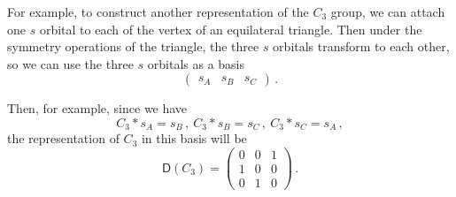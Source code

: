 \documentclass{article}
\theoremstyle{plain}\theoremheaderfont{\normalfont\itshape}\theorembodyfont{\rmfamily}\theoremseparator{.}\newtheorem*{rem}{Remark}\newtheorem*{ex}{Example}\newtheorem*{proof}{Proof}\newtheorem*{altp}{Alternative proof}
\theoremstyle{plain}\theoremheaderfont{\normalfont\bfseries}\theorembodyfont{\rmfamily}\theoremseparator{.}\newtheorem{thm}{Theorem}[section]\newtheorem{lem}[thm]{Lemma}\newtheorem{prop}[thm]{Proposition}\newtheorem*{cor}{Corollary}\newtheorem{defn}[thm]{Definition}\newtheorem{clm}[thm]{Claim}\newtheorem{clminproof}{Claim}\newtheorem*{law}{Law}\newtheorem{pos}[thm]{Postulate}
\theoremstyle{break}\theoremheaderfont{\normalfont\itshape}\theorembodyfont{\rmfamily}\theoremseparator{.\medskip}\newtheorem*{proofskip}{Proof}\newtheorem*{exs}{Examples}\newtheorem*{rems}{Remarks}
\theoremstyle{break}\theoremheaderfont{\normalfont\bfseries}\theorembodyfont{\rmfamily}\theoremseparator{.\medskip}\newtheorem{lemskip}[thm]{Lemma}\newtheorem{defnskip}[thm]{Definition}\newtheorem{propskip}[thm]{Proposition}\newtheorem{thmskip}[thm]{Theorem}
\numberwithin{equation}{section}
\newcommand{\DD}{\mathsf{D}}
\begin{document}
    For example, to construct another representation of the \(C_3\) group, we can attach one \(s\) orbital to each of the vertex of an equilateral triangle. Then under the symmetry operations of the triangle, the three \(s\) orbitals transform to each other, so we can use the three \(s\) orbitals as a basis
    \begin{equation}
        \begin{pmatrix}
            s_A & s_B & s_C
        \end{pmatrix}\,.
    \end{equation}
    \begin{figure}[ht!]
        \centering
    \end{figure}

    Then, for example, since we have
    \begin{equation}
        C_3*s_A=s_B\,,\ C_3*s_B=s_C\,,\ C_3*s_C=s_A\,,
    \end{equation}
    the representation of \(C_3\) in this basis will be
    \begin{equation}
        \DD(C_3)=\begin{pmatrix}
            0 & 0 & 1 \\
            1 & 0 & 0 \\
            0 & 1 & 0
        \end{pmatrix}\,.
    \end{equation}
\end{document}
